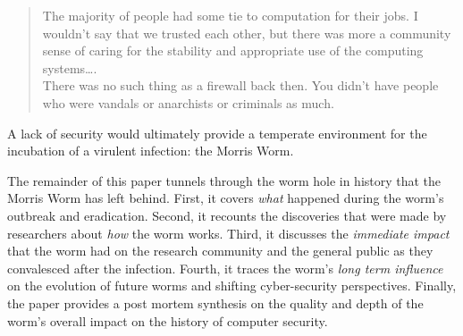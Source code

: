 \begin{quote}
The majority of people had some tie to computation for their jobs. I wouldn't
say that we trusted each other, but there was more a community sense of caring
for the stability and appropriate use of the computing systems\ldots. \\
There was no such thing as a firewall back then. You didn't have people who were
vandals or anarchists or criminals as much. 
\end{quote}

A lack of
security would ultimately provide a temperate environment for the incubation of
a virulent infection: the Morris Worm.

The remainder of this
paper tunnels through the worm hole in history that the Morris Worm
has left behind. First, it covers \textit{what} happened during the worm's
outbreak and eradication. Second, it recounts the discoveries that were made
by researchers about \textit{how} the worm works. Third,
it discusses the \textit{immediate impact} that the worm had on the research
community and the general public as they convalesced after the infection.
Fourth, it traces the worm's \textit{long term influence} on the evolution of future
worms and shifting cyber-security perspectives. Finally, the paper
provides a post mortem synthesis on the quality and depth of the worm's overall
impact on the history of computer security. 
